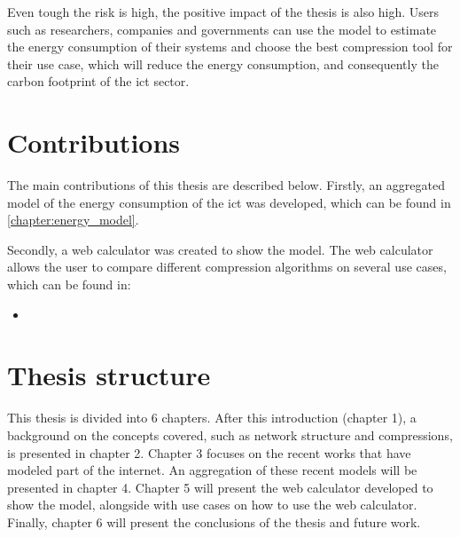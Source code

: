 Even tough the risk is high, the positive impact of the thesis is also high. Users such as researchers, companies and governments can use the model to estimate the energy consumption of their systems and choose the best compression tool for their use case, which will reduce the energy consumption, and consequently the carbon footprint of the \ac{ict} sector.

\section{Contributions}

The main contributions of this thesis are described below.
Firstly, an aggregated model of the energy consumption of the \ac{ict} was developed, which can be found in \ref{chapter:energy_model}.

Secondly, a web calculator was created to show the model. The web calculator allows the user to compare different compression algorithms on several use cases, which can be found in:

\begin{itemize}
    \item %
\end{itemize}


\section{Thesis structure}

This thesis is divided into 6 chapters. After this introduction (chapter 1), a background on the concepts covered, such as network structure and compressions, is presented in chapter 2. 
Chapter 3 focuses on the recent works that have modeled part of the internet. 
An aggregation of these recent models will be presented in chapter 4. 
Chapter 5 will present the web calculator developed to show the model, alongside with use cases on how to use the web calculator. 
Finally, chapter 6 will present the conclusions of the thesis and future work.


